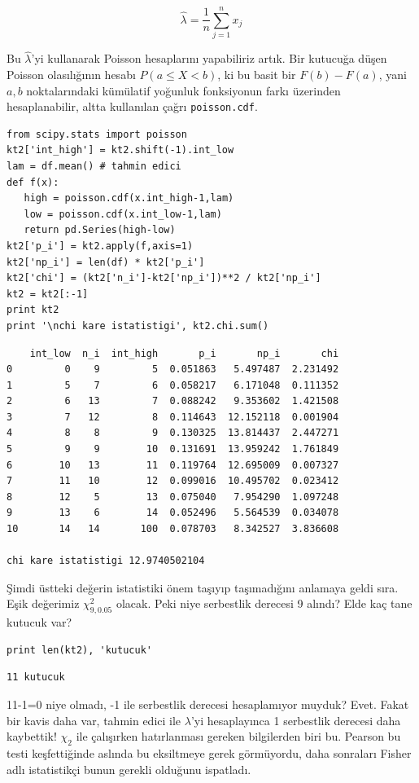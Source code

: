 \documentclass[12pt,fleqn]{article}\usepackage{../../common}
\begin{document}
$$ \hat{\lambda} = \frac{1}{n} \sum _{j=1}^{n}x_j $$

Bu $\hat{\lambda}$'yi kullanarak Poisson hesaplarını yapabiliriz artık. Bir
kutucuğa düşen Poisson olasılığının hesabı $P(a \le X < b)$, ki bu basit
bir $F(b)-F(a)$, yani $a,b$ noktalarındaki kümülatif yoğunluk fonksiyonun
farkı üzerinden hesaplanabilir, altta kullanılan çağrı \verb!poisson.cdf!.

\begin{verbatim}
from scipy.stats import poisson
kt2['int_high'] = kt2.shift(-1).int_low
lam = df.mean() # tahmin edici
def f(x): 
   high = poisson.cdf(x.int_high-1,lam)
   low = poisson.cdf(x.int_low-1,lam)
   return pd.Series(high-low)
kt2['p_i'] = kt2.apply(f,axis=1)
kt2['np_i'] = len(df) * kt2['p_i']
kt2['chi'] = (kt2['n_i']-kt2['np_i'])**2 / kt2['np_i']
kt2 = kt2[:-1]
print kt2
print '\nchi kare istatistigi', kt2.chi.sum()
\end{verbatim}

\begin{verbatim}
    int_low  n_i  int_high       p_i       np_i       chi
0         0    9         5  0.051863   5.497487  2.231492
1         5    7         6  0.058217   6.171048  0.111352
2         6   13         7  0.088242   9.353602  1.421508
3         7   12         8  0.114643  12.152118  0.001904
4         8    8         9  0.130325  13.814437  2.447271
5         9    9        10  0.131691  13.959242  1.761849
6        10   13        11  0.119764  12.695009  0.007327
7        11   10        12  0.099016  10.495702  0.023412
8        12    5        13  0.075040   7.954290  1.097248
9        13    6        14  0.052496   5.564539  0.034078
10       14   14       100  0.078703   8.342527  3.836608

chi kare istatistigi 12.9740502104
\end{verbatim}

Şimdi üstteki değerin istatistiki önem taşıyıp taşımadığını anlamaya geldi
sıra. Eşik değerimiz $\chi^2_{9,0.05}$ olacak. Peki niye serbestlik
derecesi 9 alındı? Elde kaç tane kutucuk var? 

\begin{verbatim}
print len(kt2), 'kutucuk'
\end{verbatim}

\begin{verbatim}
11 kutucuk
\end{verbatim}

11-1=0 niye olmadı, -1 ile serbestlik derecesi hesaplamıyor muyduk?
Evet. Fakat bir kavis daha var, tahmin edici ile $\lambda$'yi hesaplayınca
1 serbestlik derecesi daha kaybettik! $\chi_2$ ile çalışırken hatırlanması
gereken bilgilerden biri bu. Pearson bu testi keşfettiğinde aslında bu
eksiltmeye gerek görmüyordu, daha sonraları Fisher adlı istatistikçi bunun
gerekli olduğunu ispatladı.
\end{document}
